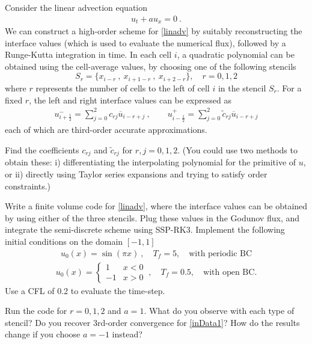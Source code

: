 \documentclass{article}
\newcommand{\iph}{{i + \frac{1}{2}}}
\newcommand{\imh}{{i - \frac{1}{2}}}
\begin{document}



Consider the linear advection equation
\begin{gather} \label{linadv}
	u_t + a u_x = 0\ .
\end{gather}%
We can construct a high-order scheme for \eqref{linadv} by suitably reconstructing the interface values (which is used to evaluate the numerical flux), followed by a Runge-Kutta integration in time. In each cell $i$, a quadratic polynomial can be obtained using the cell-average values, by choosing one of the following stencils
\[
S_r = \{x_{i-r}\ , \ x_{i+1-r}\ , \ x_{i+2-r} \}, \quad r = 0,1,2
\]
where $r$ represents the number of cells to the left of cell $i$ in the stencil $S_r$. For a fixed $r$, the left and right interface values can be expressed as
\begin{gather} \label{rec}
u_\iph^- = \sum \limits_{j=0}^2 c_{rj} \overline{u}_{i-r+j}\ , \qquad  u_\imh^+ = \sum \limits_{j=0}^2 \tilde{c}_{rj} \overline{u}_{i-r+j}
\end{gather}%
each of which are third-order accurate approximations. 


\begin{exerciseList}

\item 
Find the coefficients ${c}_{rj}$ and $\tilde{c}_{rj}$ for $r,j = 0,1,2$. (You could use two methods to obtain these: i) differentiating the interpolating polynomial for the primitive of $u$, or ii) directly using Taylor series expansions and trying to satisfy order constraints.)

\item Write a finite volume code for \eqref{linadv}, where the interface values can be obtained by using either of the three stencils. Plug these values in the Godunov flux, and integrate the semi-discrete scheme using SSP-RK3. Implement the following initial conditions on the domain $[-1,1]$
\begin{gather} \label{inData1}
	u_0(x)=\sin(\pi x)\ ,  
	\quad
	T_f = 5, \quad \text{with periodic BC}
\end{gather}%
\begin{gather} \label{inData2}
	u_0(x)=\begin{cases}
		1 & x<0\\
		-1 & x>0
	\end{cases}\ ,
	\quad
	T_f = 0.5, \quad \text{with open BC}.
\end{gather}%
Use a CFL of 0.2 to evaluate the time-step. 

\item
Run the code for $r=0,1,2$ and $a=1$. What do you observe with each type of stencil? Do you recover 3rd-order convergence for \eqref{inData1}? How do the results change if you choose $a=-1$ instead?



\end{exerciseList}
\end{document}
